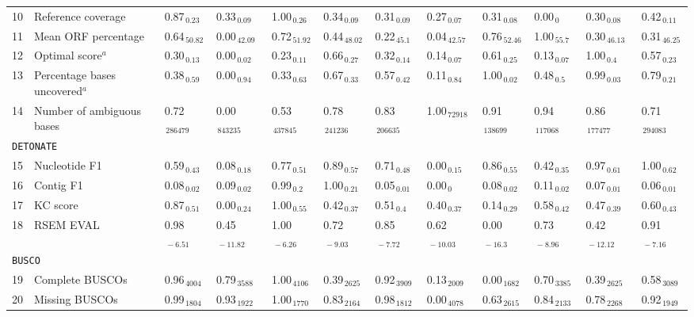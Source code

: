 \documentclass{scrartcl}
\begin{document}
\begin{landscape}
\begin{table}
\begin{scriptsize}
\begin{tabular}{llllllllllll}
10 & Reference coverage  & 0.87$_{\,0.23}$ & 0.33$_{\,0.09}$ & 1.00$_{\,0.26}$ & 0.34$_{\,0.09}$ & 0.31$_{\,0.09}$ & 0.27$_{\,0.07}$ & 0.31$_{\,0.08}$ & 0.00$_{\,0}$ & 0.30$_{\,0.08}$ & 0.42$_{\,0.11}$ \\11 & Mean ORF percentage  & 0.64$_{\,50.82}$ & 0.00$_{\,42.09}$ & 0.72$_{\,51.92}$ & 0.44$_{\,48.02}$ & 0.22$_{\,45.1}$ & 0.04$_{\,42.57}$ & 0.76$_{\,52.46}$ & 1.00$_{\,55.7}$ & 0.30$_{\,46.13}$ & 0.31$_{\,46.25}$ \\12 & Optimal score$^{a}$  & 0.30$_{\,0.13}$ & 0.00$_{\,0.02}$ & 0.23$_{\,0.11}$ & 0.66$_{\,0.27}$ & 0.32$_{\,0.14}$ & 0.14$_{\,0.07}$ & 0.61$_{\,0.25}$ & 0.13$_{\,0.07}$ & 1.00$_{\,0.4}$ & 0.57$_{\,0.23}$ \\13 & Percentage bases uncovered$^{a}$  & 0.38$_{\,0.59}$ & 0.00$_{\,0.94}$ & 0.33$_{\,0.63}$ & 0.67$_{\,0.33}$ & 0.57$_{\,0.42}$ & 0.11$_{\,0.84}$ & 1.00$_{\,0.02}$ & 0.48$_{\,0.5}$ & 0.99$_{\,0.03}$ & 0.79$_{\,0.21}$ \\14 & Number of ambiguous bases  & 0.72$_{\,286479}$ & 0.00$_{\,843235}$ & 0.53$_{\,437845}$ & 0.78$_{\,241236}$ & 0.83$_{\,206635}$ & 1.00$_{\,72918}$ & 0.91$_{\,138699}$ & 0.94$_{\,117068}$ & 0.86$_{\,177477}$ & 0.71$_{\,294083}$ \\\midrule
\multicolumn{11}{l}{\texttt{DETONATE}}\\ 
\midrule
15 & Nucleotide F1  & 0.59$_{\,0.43}$ & 0.08$_{\,0.18}$ & 0.77$_{\,0.51}$ & 0.89$_{\,0.57}$ & 0.71$_{\,0.48}$ & 0.00$_{\,0.15}$ & 0.86$_{\,0.55}$ & 0.42$_{\,0.35}$ & 0.97$_{\,0.61}$ & 1.00$_{\,0.62}$ \\16 & Contig F1  & 0.08$_{\,0.02}$ & 0.09$_{\,0.02}$ & 0.99$_{\,0.2}$ & 1.00$_{\,0.21}$ & 0.05$_{\,0.01}$ & 0.00$_{\,0}$ & 0.08$_{\,0.02}$ & 0.11$_{\,0.02}$ & 0.07$_{\,0.01}$ & 0.06$_{\,0.01}$ \\17 & KC score  & 0.87$_{\,0.51}$ & 0.00$_{\,0.24}$ & 1.00$_{\,0.55}$ & 0.42$_{\,0.37}$ & 0.51$_{\,0.4}$ & 0.40$_{\,0.37}$ & 0.14$_{\,0.29}$ & 0.58$_{\,0.42}$ & 0.47$_{\,0.39}$ & 0.60$_{\,0.43}$ \\18 & RSEM EVAL  & 0.98$_{\,-6.51}$ & 0.45$_{\,-11.82}$ & 1.00$_{\,-6.26}$ & 0.72$_{\,-9.03}$ & 0.85$_{\,-7.72}$ & 0.62$_{\,-10.03}$ & 0.00$_{\,-16.3}$ & 0.73$_{\,-8.96}$ & 0.42$_{\,-12.12}$ & 0.91$_{\,-7.16}$ \\\midrule
\multicolumn{11}{l}{\texttt{BUSCO}}\\ 
\midrule
19 & Complete BUSCOs  & 0.96$_{\,4004}$ & 0.79$_{\,3588}$ & 1.00$_{\,4106}$ & 0.39$_{\,2625}$ & 0.92$_{\,3909}$ & 0.13$_{\,2009}$ & 0.00$_{\,1682}$ & 0.70$_{\,3385}$ & 0.39$_{\,2625}$ & 0.58$_{\,3089}$ \\20 & Missing BUSCOs  & 0.99$_{\,1804}$ & 0.93$_{\,1922}$ & 1.00$_{\,1770}$ & 0.83$_{\,2164}$ & 0.98$_{\,1812}$ & 0.00$_{\,4078}$ & 0.63$_{\,2615}$ & 0.84$_{\,2133}$ & 0.78$_{\,2268}$ & 0.92$_{\,1949}$ \\\midrule

\end{tabular}
\end{scriptsize}
\end{table}
\end{landscape}
\end{document}
